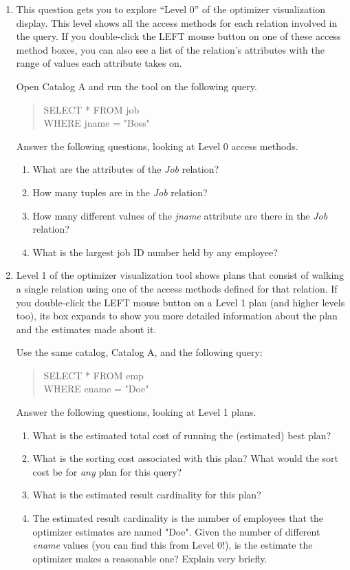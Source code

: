 \begin{enumerate}
\item
This question gets you to explore ``Level 0'' of the optimizer visualization
display.  This level shows all the access methods for each relation involved
in the query.  If you double-click the LEFT mouse button on one of these
access method boxes, you can also see a list of the relation's attributes
with the range of values each attribute takes on.

Open Catalog A and run the tool on the following query.  
\begin{quote}
        SELECT * FROM job\\
        WHERE jname = "Boss"
\end{quote}

Answer the following questions, looking at Level 0 access methods.
\begin{enumerate}
\item
What are the attributes of the {\em Job} relation?
\item
How many tuples are in the {\em Job} relation?
\item
How many different values of the {\em jname} attribute are there in
the {\em Job} relation?
\item
What is the largest job ID number held by any employee?
\end{enumerate}


\item

Level 1 of the optimizer visualization tool shows plans that consist of
walking a single relation using one of the access methods defined for that
relation.  If you double-click the LEFT mouse button on a Level 1 plan (and
higher levels too), its box expands to show you more detailed information
about the plan and the estimates made about it.

Use the same catalog, Catalog A, and the following query:
\begin{quote}
        SELECT * FROM emp\\
        WHERE ename = "Doe"
\end{quote}

Answer the following questions, looking at Level 1 plans.
\begin{enumerate}
\item
What is the estimated total cost of running the (estimated) best plan?
\item
What is the sorting cost associated with
this plan?  What would the sort cost be for {\em any}
plan for this query?
\item
What is the estimated result cardinality for this plan?
\item
The estimated result cardinality is the number of employees that the
optimizer estimates are named "Doe".  Given 
the number of different {\em ename} values (you can find this from
Level 0!),
is the estimate the optimizer makes a reasonable one? Explain very briefly.
\end{enumerate}



\end{enumerate}
